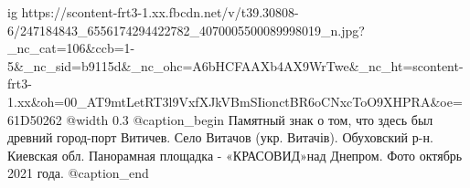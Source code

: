  
 
 
 
 

\ifcmt
  ig https://scontent-frt3-1.xx.fbcdn.net/v/t39.30808-6/247184843_6556174294422782_4070005500089998019_n.jpg?_nc_cat=106&ccb=1-5&_nc_sid=b9115d&_nc_ohc=A6bHCFAAXb4AX9WrTwe&_nc_ht=scontent-frt3-1.xx&oh=00_AT9mtLetRT3l9VxfXJkVBmSIionctBR6oCNxcToO9XHPRA&oe=61D50262
  @width 0.3
  @caption_begin
    Памятный знак о том, что здесь был древний город-порт Витичев.
    Село Витачов (укр. Витачів). Обуховский р-н. Киевская обл. 
    Панорамная площадка - «КРАСОВИД»над Днепром. Фото октябрь 2021 года.
  @caption_end
\fi
